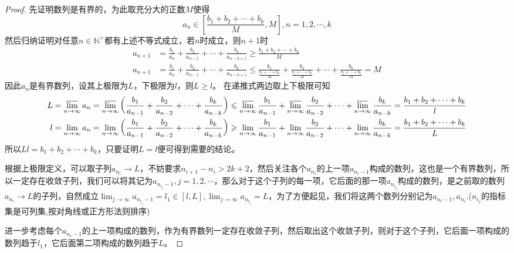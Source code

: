 \documentclass[../../main.tex]{subfiles}%
\begin{document}
\begin{proof}
先证明数列是有界的，为此取充分大的正数\(M\)使得
\[a_n\in\left[\frac{b_1 + b_2+\cdots + b_k}{M},M\right],n = 1,2,\cdots,k\]
然后归纳证明对任意\(n\in\mathbb{N}^+\)都有上述不等式成立，若\(n\)时成立，则\(n + 1\)时
\begin{align*}
a_{n + 1}&=\frac{b_1}{a_n}+\frac{b_2}{a_{n - 1}}+\cdots+\frac{b_k}{a_{n - k+1}}\geqslant \frac{b_1 + b_2+\cdots + b_k}{M}\\
a_{n + 1}&=\frac{b_1}{a_n}+\frac{b_2}{a_{n - 1}}+\cdots+\frac{b_k}{a_{n - k+1}}\leqslant \frac{b_1}{\frac{b_1 + \cdots + b_k}{M}}+\frac{b_2}{\frac{b_1 + \cdots + b_k}{M}}+\cdots+\frac{b_k}{\frac{b_1 + \cdots + b_k}{M}}=M
\end{align*}
因此\(a_n\)是有界数列，设其上极限为\(L\)，下极限为\(l\)，则\(L\geqslant  l\)。
在递推式两边取上下极限可知
\begin{align*}
L&=\varlimsup_{n\rightarrow\infty}a_n=\varlimsup_{n\rightarrow\infty}\left(\frac{b_1}{a_{n - 1}}+\frac{b_2}{a_{n - 2}}+\cdots+\frac{b_k}{a_{n - k}}\right)\leqslant \varlimsup_{n\rightarrow\infty}\frac{b_1}{a_{n - 1}}+\varlimsup_{n\rightarrow\infty}\frac{b_2}{a_{n - 2}}+\cdots+\varlimsup_{n\rightarrow\infty}\frac{b_k}{a_{n - k}}=\frac{b_1 + b_2+\cdots + b_k}{l}\\
l&=\lim_{n\rightarrow\infty}a_n=\lim_{n\rightarrow\infty}\left(\frac{b_1}{a_{n - 1}}+\frac{b_2}{a_{n - 2}}+\cdots+\frac{b_k}{a_{n - k}}\right)\geqslant \lim_{n\rightarrow\infty}\frac{b_1}{a_{n - 1}}+\lim_{n\rightarrow\infty}\frac{b_2}{a_{n - 2}}+\cdots+\lim_{n\rightarrow\infty}\frac{b_k}{a_{n - k}}=\frac{b_1 + b_2+\cdots + b_k}{L}
\end{align*}
所以\(Ll=b_1 + b_2+\cdots + b_k\)，只要证明\(L = l\)便可得到需要的结论。

根据上极限定义，可以取子列\(a_{n_i}\to L\)，不妨要求\(n_{i + 1}-n_i>2k + 2\)，然后关注各个\(a_{n_i}\)的上一项\(a_{n_i - 1}\)构成的数列，这也是一个有界数列，所以一定存在收敛子列，我们可以将其记为\(a_{n_{i_j}-1},j = 1,2,\cdots\)，那么对于这个子列的每一项，它后面的那一项\(a_{n_{i_j}}\)构成的数列，是之前取的数列\(a_{n_i}\to L\)的子列，自然成立\(\lim_{j\rightarrow\infty}a_{n_{i_j}-1}=l_1\in[l,L],\lim_{j\rightarrow\infty}a_{n_{i_j}} = L\)，为了方便起见，我们将这两个数列分别记为\(a_{n_{i}-1},a_{n_{i}}\).($n_{i_j}$的指标集是可列集,按对角线或正方形法则排序)

进一步考虑每个\(a_{n_{i}-1}\)的上一项构成的数列，作为有界数列一定存在收敛子列，然后取出这个收敛子列，则对于这个子列，它后面一项构成的数列趋于\(l_1\)，它后面第二项构成的数列趋于\(L\)。


\end{proof}
\end{document}
